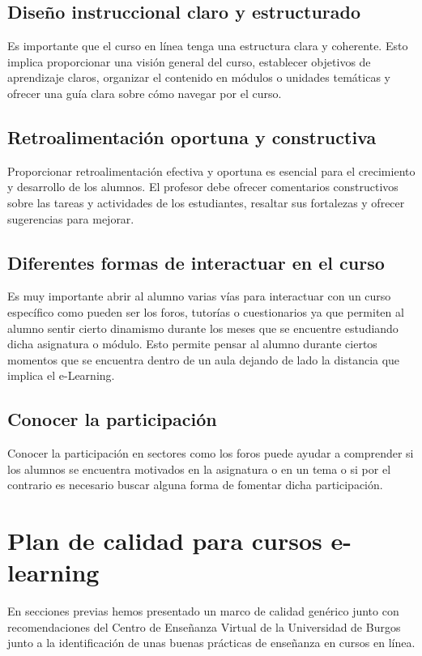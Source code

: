 \subsection{Diseño instruccional claro y estructurado}
Es importante que el curso en línea tenga una estructura clara y coherente. Esto implica proporcionar una visión general del curso, establecer objetivos de aprendizaje claros, organizar el contenido en módulos o unidades temáticas y ofrecer una guía clara sobre cómo navegar por el curso. 

\subsection{Retroalimentación oportuna y constructiva}
Proporcionar retroalimentación efectiva y oportuna es esencial para el crecimiento y desarrollo de los alumnos. El profesor debe ofrecer comentarios constructivos sobre las tareas y actividades de los estudiantes, resaltar sus fortalezas y ofrecer sugerencias para mejorar.

\subsection{Diferentes formas de interactuar en el curso}
Es muy importante abrir al alumno varias vías para interactuar con un curso específico como pueden ser los foros, tutorías o cuestionarios ya que permiten al alumno sentir cierto dinamismo durante los meses que se encuentre estudiando dicha asignatura o módulo. Esto permite pensar al alumno durante ciertos momentos que se encuentra dentro de un aula dejando de lado la distancia que implica el e-Learning.

\subsection{Conocer la participación}
Conocer la participación en sectores como los foros puede ayudar a comprender si los alumnos se encuentra motivados en la asignatura o en un tema o si por el contrario es necesario buscar alguna forma de fomentar dicha participación.

\section{Plan de calidad para cursos e-learning}
En secciones previas hemos presentado un marco de calidad genérico junto con recomendaciones del Centro de Enseñanza Virtual de la Universidad de Burgos junto a la identificación de unas buenas prácticas de enseñanza en cursos en línea.

